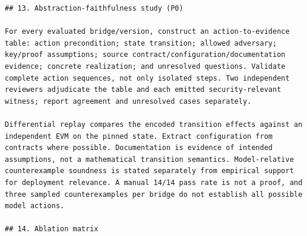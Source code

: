 \documentclass[11pt,a4paper]{article}
\begin{document}
\begin{verbatim}
## 13. Abstraction-faithfulness study (P0)

For every evaluated bridge/version, construct an action-to-evidence table: action precondition; state transition; allowed adversary; key/proof assumptions; source contract/configuration/documentation evidence; concrete realization; and unresolved questions. Validate complete action sequences, not only isolated steps. Two independent reviewers adjudicate the table and each emitted security-relevant witness; report agreement and unresolved cases separately.

Differential replay compares the encoded transition effects against an independent EVM on the pinned state. Extract configuration from contracts where possible. Documentation is evidence of intended assumptions, not a mathematical transition semantics. Model-relative counterexample soundness is stated separately from empirical support for deployment relevance. A manual 14/14 pass rate is not a proof, and three sampled counterexamples per bridge do not establish all possible model actions.

## 14. Ablation matrix


\end{verbatim}
\end{document}
